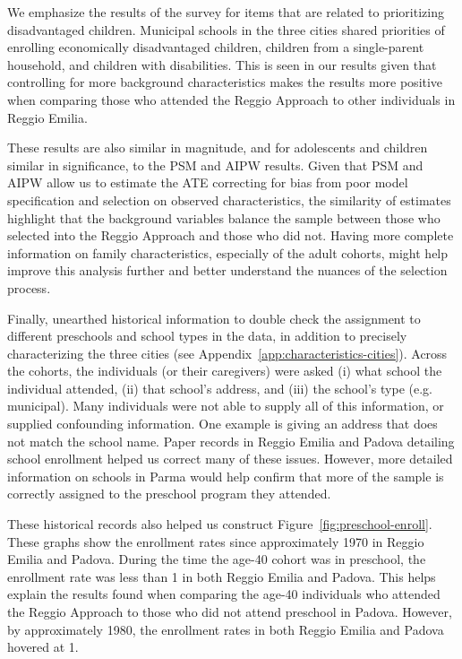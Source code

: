 We emphasize the results of the survey for items that are related to prioritizing disadvantaged children. Municipal schools in the three cities shared priorities of enrolling economically disadvantaged children, children from a single-parent household, and children with disabilities. This is seen in our results given that controlling for more background characteristics makes the results more positive when comparing those who attended the Reggio Approach to other individuals in Reggio Emilia. 

These results are also similar in magnitude, and for adolescents and children similar in significance, to the PSM and AIPW results. Given that PSM and AIPW allow us to estimate the ATE correcting for bias from poor model specification and selection on observed characteristics, the similarity of estimates highlight that the background variables balance the sample between those who selected into the Reggio Approach and those who did not. Having more complete information on family characteristics, especially of the adult cohorts, might help improve this analysis further and better understand the nuances of the selection process. 

Finally, unearthed historical information to double check the assignment to different preschools and school types in the data, in addition to precisely characterizing the three cities (see Appendix~\ref{app:characteristics-cities}). Across the cohorts, the individuals (or their caregivers) were asked (i) what school the individual attended, (ii) that school's address, and (iii) the school's type (e.g. municipal). Many individuals were not able to supply all of this information, or supplied confounding information. One example is giving an address that does not match the school name. Paper records in Reggio Emilia and Padova detailing school enrollment helped us correct many of these issues. However, more detailed information on schools in Parma would help confirm that more of the sample is correctly assigned to the preschool program they attended.

These historical records also helped us construct Figure~\ref{fig:preschool-enroll}. These graphs show the enrollment rates since approximately 1970 in Reggio Emilia and Padova. During the time the age-40 cohort was in preschool, the enrollment rate was less than 1 in both Reggio Emilia and Padova. This helps explain the results found when comparing the age-40 individuals who attended the Reggio Approach to those who did not attend preschool in Padova. However, by approximately 1980, the enrollment rates in both Reggio Emilia and Padova hovered at 1. 

